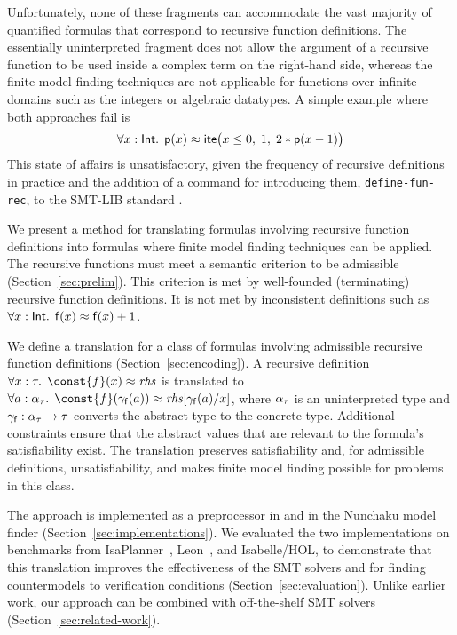Unfortunately, none of these fragments can accommodate the vast majority of
quantified formulas that correspond to recursive function definitions. The
essentially uninterpreted fragment does not allow the argument of a
recursive function to be used inside a complex term on the right-hand side,
whereas the finite model finding techniques %
are not applicable for functions over infinite domains such as the integers or
algebraic datatypes. A simple example where both approaches fail is
$$\forall x : {\mathsf{Int}}.\;\,
\mathsf{p}( x ) \approx \mathsf{ite}\bigl( x \leq 0,\allowbreak\;  1,\allowbreak\;
  2 * \mathsf{p}( x - 1 ) \bigr)$$ %
This state of affairs is unsatisfactory, given the frequency of
recursive definitions in practice and the %
addition of a %
command for introducing them, \texttt{define-fun-rec},
to the SMT-LIB standard \cite{smtlib25}.

We present a method for translating formulas involving recursive function
definitions into formulas where finite model finding techniques can be applied.
The recursive functions must meet a semantic criterion to be admissible
(Section~\ref{sec:prelim}). This criterion is met by well-founded (terminating)
recursive function definitions. It is not met by inconsistent
definitions such as \,$\forall x : {\mathsf{Int}}.\;\, \mathsf{f}(x) \approx \mathsf{f}(x) +
1$.

We define a translation for a class of
formulas involving admissible recursive function definitions
(Section~\ref{sec:encoding}). A
recursive definition $\forall x : \tau.\;\, \const{f}(x) \teq \mathit{rhs}$
is translated to
$\forall a :
\fargtype{\tau}.\;\, \const{f}(\farg{\con{f}}(a)) \teq \mathit{rhs}[\farg{\con{f}}(a)/x]$, where
$\alpha_{\tau}$ is an uninterpreted  type and $\gamma_{\mathsf{f}} :
\alpha_{\tau} \to \tau$ converts the abstract type to the concrete
type. Additional constraints ensure that the abstract values that are relevant
to the formula's satisfiability
exist. The translation preserves satisfiability and, for admissible definitions,
unsatisfiability, and makes finite model finding possible for problems in this
class.

The approach is implemented as a preprocessor in \cvc and in the Nunchaku
model finder (Section~\ref{sec:implementations}).
%
We evaluated the two implementations on benchmarks from
IsaPlanner~\cite{DBLP:conf/itp/JohanssonDB10}, Leon~\cite{blanc2013overview},
and Isabelle/HOL, to demonstrate that this translation improves the
effectiveness of the SMT solvers \cvc and \ziii for finding countermodels to
verification conditions (Section~\ref{sec:evaluation}). Unlike earlier work,
our approach can be combined with off-the-shelf SMT solvers
(Section~\ref{sec:related-work}).

